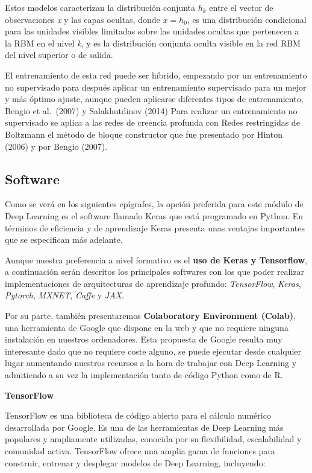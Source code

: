 \documentclass[
  a4paper,
  DIV=11,
  numbers=noendperiod]{scrreprt}
\begin{document}
Estos modelos caracterizan la distribución conjunta \(h_k\) entre el
vector de observaciones \emph{x} y las capas ocultas, donde \(x=h_0\),
es una distribución condicional para las unidades visibles limitadas
sobre las unidades ocultas que pertenecen a la RBM en el nivel \emph{k},
y es la distribución conjunta oculta visible en la red RBM del nivel
superior o de salida.

El entrenamiento de esta red puede ser híbrido, empezando por un
entrenamiento no supervisado para después aplicar un entrenamiento
supervisado para un mejor y más óptimo ajuste, aunque pueden aplicarse
diferentes tipos de entrenamiento, Bengio et al.~(2007) y Salakhutdinov
(2014) Para realizar un entrenamiento no supervisado se aplica a las
redes de creencia profunda con Redes restringidas de Boltzmann el método
de bloque constructor que fue presentado por Hinton (2006) y por Bengio
(2007).

\subsection{Software}\label{software}

Como se verá en los siguientes epígrafes, la opción preferida para este
módulo de Deep Learning es el software llamado Keras que está programado
en Python. En términos de eficiencia y de aprendizaje Keras presenta
unas ventajas importantes que se especifican más adelante.

Aunque nuestra preferencia a nivel formativo es el \textbf{uso de Keras
y Tensorflow}, a continuación serán descritos los principales softwares
con los que poder realizar implementaciones de arquitecturas de
aprendizaje profundo: \emph{TensorFlow}, \emph{Keras}, \emph{Pytorch},
\emph{MXNET}, \emph{Caffe} y \emph{JAX}.

Por su parte, también presentaremos \textbf{Colaboratory Environment
(Colab)}, una herramienta de Google que dispone en la web y que no
requiere ninguna instalación en nuestros ordenadores. Esta propuesta de
Google resulta muy interesante dado que no requiere coste alguno, se
puede ejecutar desde cualquier lugar aumentando nuestros recursos a la
hora de trabajar con Deep Learning y admitiendo a su vez la
implementación tanto de código Python como de R.

\textbf{TensorFlow}

TensorFlow es una biblioteca de código abierto para el cálculo numérico
desarrollada por Google. Es una de las herramientas de Deep Learning más
populares y ampliamente utilizadas, conocida por su flexibilidad,
escalabilidad y comunidad activa. TensorFlow ofrece una amplia gama de
funciones para construir, entrenar y desplegar modelos de Deep Learning,
incluyendo:
\end{document}
